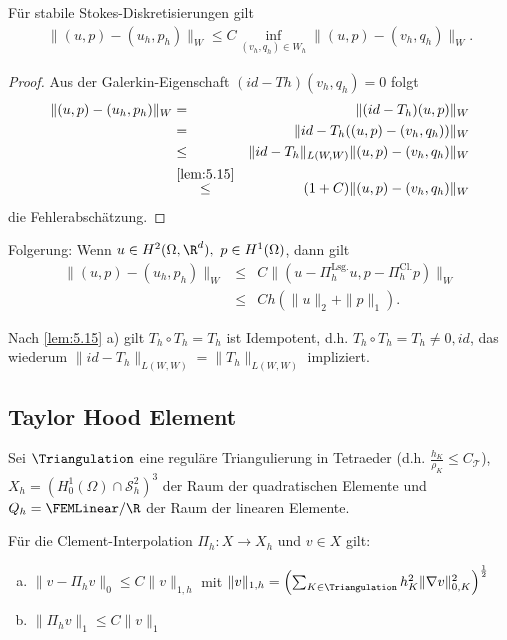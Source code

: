 \begin{Satz}
    \label{satz:5.16}
    Für stabile Stokes-Diskretisierungen gilt
    \begin{eqnarray*}
            \|(u, p) - (u_h, p_h)\|_W
        \le C \inf_{(v_h, q_h)\in W_h} \|(u, p) - (v_h, q_h)\|_W.
    \end{eqnarray*}
\end{Satz}


\begin{proof}
    Aus der Galerkin-Eigenschaft $(id - Th)(v_h, q_h) = 0$ folgt
    \begin{eqnarray*}
            \|(u, p) - (u_h, p_h)\|_W
        &=& \|(id - T_h)(u, p)\|_W \\
        &=& \|id - T_h((u, p) - (v_h, q_h))\|_W \\
        &\le& \|id - T_h\|_{L(W, W)} \|(u, p) - (v_h, q_h)\|_W \\
        &\stackrel{\eqref{lem:5.15}}{\le}&
              (1 + C ) \|(u, p) - (v_h, q_h)\|_W
    \end{eqnarray*}
    die Fehlerabschätzung.
\end{proof}


Folgerung:
Wenn $u\in H^2(\Omega, \R^d), \ p\in H^1(\Omega)$, dann gilt
\begin{eqnarray*}
          \|(u, p) - (u_h, p_h)\|_W
    &\le& C \|(u - \Pi_h^\text{Lsg.} u, p - \Pi_h^\text{Cl.} p)\|_W \\
    &\le& C h (\|u\|_2 + \|p\|_1).
\end{eqnarray*}


\begin{Bemerkung}
    Nach \eqref{lem:5.15} a) gilt $T_h \circ T_h = T_h$ ist Idempotent, d.h.
    $T_h \circ T_h = T_h \neq 0, id$, das wiederum $\|id - T_h\|_{L(W,W)} =
    \|T_h\|_{L(W,W)}$ impliziert.
\end{Bemerkung}


\subsection{Taylor Hood Element}



Sei $\Triangulation$ eine reguläre Triangulierung in Tetraeder (d.h.
$\frac{h_K}{\rho_K} \le C_\mathcal{T}$), 
$X_h = (H_0^1(\Omega) \cap \mathcal{S}_h^2)^3$
der Raum der quadratischen Elemente und
$Q_h = \FEMLinear / \R$ der Raum der linearen Elemente.


\begin{Lemma}
    \label{lem:5.18}
    Für die Clement-Interpolation $\Pi_h: X \to X_h$ und $v\in X$ gilt:
    \begin{enumerate}[a)]
      \item
        $\|v - \Pi_h v\|_0 \le C \|v\|_{1,h}$
        mit
        $\|v\|_{1,h} = \left(\sum_{K\in \Triangulation} h_K^2 \|\nabla v\|_{0,K}
        ^2\right)^\frac{1}{2}$
      \item
        $\|\Pi_h v\|_1 \le C \|v\|_1$
    \end{enumerate}
\end{Lemma}


